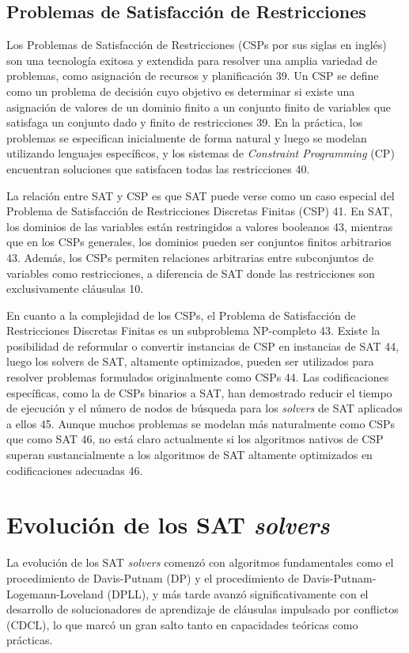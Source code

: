 \subsection{Problemas de Satisfacción de Restricciones}
Los Problemas de Satisfacción de Restricciones (CSPs por sus siglas en inglés) son una tecnología exitosa y extendida para resolver una amplia variedad de problemas, como asignación de recursos y planificación 39. Un CSP se define como un problema de decisión cuyo objetivo es determinar si existe una asignación de valores de un dominio finito a un conjunto finito de variables que satisfaga un conjunto dado y finito de restricciones 39. En la práctica, los problemas se especifican inicialmente de forma natural y luego se modelan utilizando lenguajes específicos, y los sistemas de \textit{Constraint Programming} (CP) encuentran soluciones que satisfacen todas las restricciones 40.

La relación entre SAT y CSP es que SAT puede verse como un caso especial del Problema de Satisfacción de Restricciones Discretas Finitas (CSP) 41. En SAT, los dominios de las variables están restringidos a valores booleanos 43, mientras que en los CSPs generales, los dominios pueden ser conjuntos finitos arbitrarios 43. Además, los CSPs permiten relaciones arbitrarias entre subconjuntos de variables como restricciones, a diferencia de SAT donde las restricciones son exclusivamente cláusulas 10.

En cuanto a la complejidad de los CSPs, el Problema de Satisfacción de Restricciones Discretas Finitas es un subproblema NP-completo 43. Existe la posibilidad de reformular o convertir instancias de CSP en instancias de SAT 44, luego los solvers de SAT, altamente optimizados, pueden ser utilizados para resolver problemas formulados originalmente como CSPs 44. Las codificaciones específicas, como la de CSPs binarios a SAT, han demostrado reducir el tiempo de ejecución y el número de nodos de búsqueda para los \textit{solvers} de SAT aplicados a ellos 45. Aunque muchos problemas se modelan más naturalmente como CSPs que como SAT 46, no está claro actualmente si los algoritmos nativos de CSP superan sustancialmente a los algoritmos de SAT altamente optimizados en codificaciones adecuadas 46.

\section{Evolución de los SAT \textit{solvers}}
La evolución de los SAT \textit{solvers} comenzó con algoritmos fundamentales como el procedimiento de Davis-Putnam (DP) y el procedimiento de Davis-Putnam-Logemann-Loveland (DPLL), y más tarde avanzó significativamente con el desarrollo de solucionadores de aprendizaje de cláusulas impulsado por conflictos (CDCL), lo que marcó un gran salto tanto en capacidades teóricas como prácticas.

